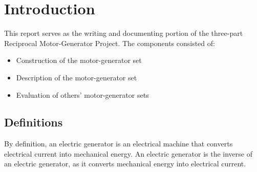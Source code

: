 \newpage
\section{Introduction}
This report serves as the writing and documenting portion of the three-part Reciprocal Motor-Generator Project. The components consisted of:

    \begin{itemize}

        \item Construction of the motor-generator set

        \item Description of the motor-generator set

        \item Evaluation of others' motor-generator sets

    \end{itemize}

    \subsection{Definitions}
    By definition, an electric generator is an electrical machine that converts electrical current into mechanical energy. An electric generator is the inverse of an electric generator, as it converts mechanical energy into electrical current.
